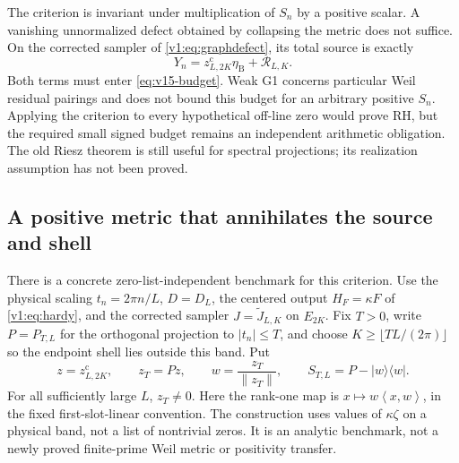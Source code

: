 \documentclass[11pt]{article}
\theoremstyle{remark}
\newcommand{\ip}[2]{\left\langle #1,#2\right\rangle}
\newcommand{\Jr}{\widetilde J}
\begin{document}
The criterion is invariant under multiplication of $S_n$ by a positive
scalar. A vanishing unnormalized defect obtained by collapsing the metric
does not suffice. On the corrected sampler of
\eqref{v1:eq:graphdefect}, its total source is exactly
\begin{equation}\label{eq:v15-total-source}
 Y_n=z^{\mathrm c}_{L,2K}\eta_{\mathrm B}+\mathcal R_{L,K}.
\end{equation}
Both terms must enter \eqref{eq:v15-budget}. Weak G1 concerns particular
Weil residual pairings and does not bound this budget for an arbitrary
positive $S_n$. Applying the criterion to every hypothetical off-line
zero would prove RH, but the required small signed budget remains an
independent arithmetic obligation. The old Riesz theorem is still useful
for spectral projections; its realization assumption has not been proved.

\subsection*{A positive metric that annihilates the source and shell}
There is a concrete zero-list-independent benchmark for this criterion.
Use the physical scaling $t_n=2\pi n/L$, $D=D_L$, the centered output
$H_F=\kappa F$ of \eqref{v1:eq:hardy}, and the corrected sampler
$J=\Jr_{L,K}$ on $E_{2K}$. Fix $T>0$, write $P=P_{T,L}$ for the
orthogonal projection to $|t_n|\le T$, and choose
$K\ge\lfloor TL/(2\pi)\rfloor$ so the endpoint shell lies outside
this band. Put
\[
 z=z^{\mathrm c}_{L,2K},\qquad z_T=Pz,\qquad
 w=\frac{z_T}{\|z_T\|},\qquad
 S_{T,L}=P-|w\rangle\langle w|.
\]
For all sufficiently large $L$, $z_T\ne0$. Here the rank-one map is
$x\mapsto w\ip{x}{w}$, in the fixed first-slot-linear convention.
The construction uses values of $\kappa\zeta$ on a physical band, not a
list of nontrivial zeros. It is an analytic benchmark, not a newly proved
finite-prime Weil metric or positivity transfer.
\end{document}
